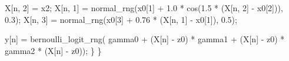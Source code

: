 \documentclass[
  letterpaper,
  DIV=11,
  numbers=noendperiod]{scrartcl}
\newenvironment{Shaded}{\begin{snugshade}}{\end{snugshade}}
\newcommand{\DecValTok}[1]{\textcolor[rgb]{0.68,0.00,0.00}{#1}}
\newcommand{\FloatTok}[1]{\textcolor[rgb]{0.68,0.00,0.00}{#1}}
\newcommand{\NormalTok}[1]{\textcolor[rgb]{0.00,0.23,0.31}{#1}}
\begin{document}
\begin{codelisting}
\begin{Shaded}
\begin{Highlighting}[]
\NormalTok{    X[n, }\DecValTok{2}\NormalTok{] = x2;}
\NormalTok{    X[n, }\DecValTok{1}\NormalTok{] = normal\_rng(x0[}\DecValTok{1}\NormalTok{] + }\FloatTok{1.0}\NormalTok{ * cos(}\FloatTok{1.5}\NormalTok{ * (X[n, }\DecValTok{2}\NormalTok{] {-} x0[}\DecValTok{2}\NormalTok{])), }\FloatTok{0.3}\NormalTok{);}
\NormalTok{    X[n, }\DecValTok{3}\NormalTok{] = normal\_rng(x0[}\DecValTok{3}\NormalTok{] + }\FloatTok{0.76}\NormalTok{ * (X[n, }\DecValTok{1}\NormalTok{] {-} x0[}\DecValTok{1}\NormalTok{]), }\FloatTok{0.5}\NormalTok{);}

\NormalTok{    y[n] = bernoulli\_logit\_rng(  gamma0 }
\NormalTok{                               + (X[n] {-} z0\textquotesingle{}) * gamma1}
\NormalTok{                               + (X[n] {-} z0\textquotesingle{}) * gamma2 * (X[n] {-} z0\textquotesingle{})\textquotesingle{});}
\NormalTok{  \}}
\NormalTok{\}}
\end{Highlighting}
\end{Shaded}

\end{codelisting}
\end{document}
